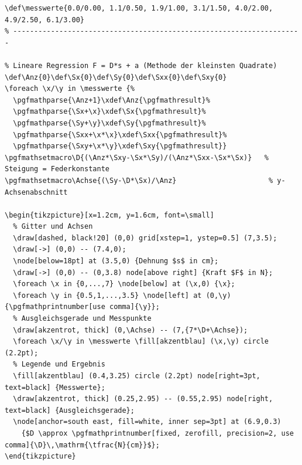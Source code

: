 \begin{lstlisting}[style=latex]
% ---- Messwerte: Dehnung s in cm / Kraft F in N ----------------------
\def\messwerte{0.0/0.00, 1.1/0.50, 1.9/1.00, 3.1/1.50, 4.0/2.00, 4.9/2.50, 6.1/3.00}
% ---------------------------------------------------------------------

% Lineare Regression F = D*s + a (Methode der kleinsten Quadrate)
\def\Anz{0}\def\Sx{0}\def\Sy{0}\def\Sxx{0}\def\Sxy{0}
\foreach \x/\y in \messwerte {%
  \pgfmathparse{\Anz+1}\xdef\Anz{\pgfmathresult}%
  \pgfmathparse{\Sx+\x}\xdef\Sx{\pgfmathresult}%
  \pgfmathparse{\Sy+\y}\xdef\Sy{\pgfmathresult}%
  \pgfmathparse{\Sxx+\x*\x}\xdef\Sxx{\pgfmathresult}%
  \pgfmathparse{\Sxy+\x*\y}\xdef\Sxy{\pgfmathresult}}
\pgfmathsetmacro\D{(\Anz*\Sxy-\Sx*\Sy)/(\Anz*\Sxx-\Sx*\Sx)}   % Steigung = Federkonstante
\pgfmathsetmacro\Achse{(\Sy-\D*\Sx)/\Anz}                      % y-Achsenabschnitt

\begin{tikzpicture}[x=1.2cm, y=1.6cm, font=\small]
  % Gitter und Achsen
  \draw[dashed, black!20] (0,0) grid[xstep=1, ystep=0.5] (7,3.5);
  \draw[->] (0,0) -- (7.4,0);
  \node[below=18pt] at (3.5,0) {Dehnung $s$ in cm};
  \draw[->] (0,0) -- (0,3.8) node[above right] {Kraft $F$ in N};
  \foreach \x in {0,...,7} \node[below] at (\x,0) {\x};
  \foreach \y in {0.5,1,...,3.5} \node[left] at (0,\y) {\pgfmathprintnumber[use comma]{\y}};
  % Ausgleichsgerade und Messpunkte
  \draw[akzentrot, thick] (0,\Achse) -- (7,{7*\D+\Achse});
  \foreach \x/\y in \messwerte \fill[akzentblau] (\x,\y) circle (2.2pt);
  % Legende und Ergebnis
  \fill[akzentblau] (0.4,3.25) circle (2.2pt) node[right=3pt, text=black] {Messwerte};
  \draw[akzentrot, thick] (0.25,2.95) -- (0.55,2.95) node[right, text=black] {Ausgleichsgerade};
  \node[anchor=south east, fill=white, inner sep=3pt] at (6.9,0.3)
    {$D \approx \pgfmathprintnumber[fixed, zerofill, precision=2, use comma]{\D}\,\mathrm{\tfrac{N}{cm}}$};
\end{tikzpicture}
\end{lstlisting}


